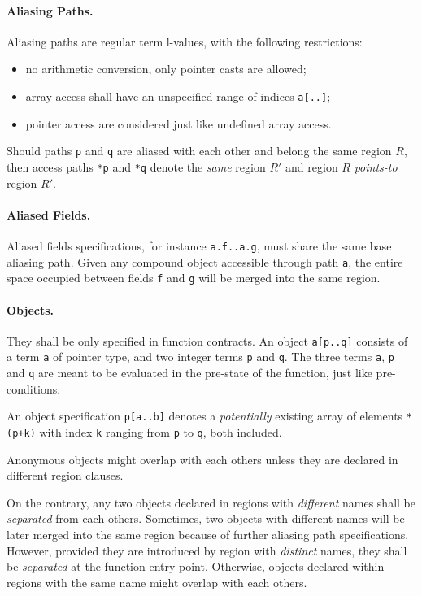 \paragraph{Aliasing Paths.}
Aliasing paths are regular \acsl term l-values, with the following
restrictions:
\begin{itemize}
\item no arithmetic conversion, only pointer casts are allowed;
\item array access shall have an unspecified range of indices \verb$a[..]$;
\item pointer access are considered just like undefined array access.
\end{itemize}
Should paths \verb+p+ and \verb+q+ are aliased with each other and belong the
same region $R$, then access paths \verb+*p+ and \verb+*q+ denote the
\emph{same} region $R'$ and region $R$ \emph{points-to} region $R'$.

\paragraph{Aliased Fields.}
Aliased fields specifications, for instance \verb+a.f..a.g+, must share the same
base aliasing path. Given any compound object accessible through path \verb+a+,
the entire space occupied between fields \verb+f+ and \verb+g+ will be merged
into the same region.

\paragraph{Objects.}
They shall be only specified in function contracts. An object \verb+a[p..q]+
consists of a term \verb+a+ of pointer type, and two integer terms \verb+p+ and
\verb+q+. The three terms \verb+a+, \verb+p+ and \verb+q+ are meant to be
evaluated in the pre-state of the function, just like pre-conditions.

An object specification \verb+p[a..b]+ denotes a \emph{potentially} existing
array of elements \verb$*(p+k)$ with index \verb+k+ ranging from \verb+p+ to
\verb+q+, both included.

Anonymous objects might overlap with each others unless they are declared in
different region clauses.

On the contrary, any two objects declared in regions with \emph{different} names
shall be \emph{separated} from each others. Sometimes, two objects with
different names will be later merged into the same region because of further
aliasing path specifications. However, provided they are introduced by region
with \emph{distinct} names, they shall be \emph{separated} at the function entry
point. Otherwise, objects declared within regions with the same name might
overlap with each others.

